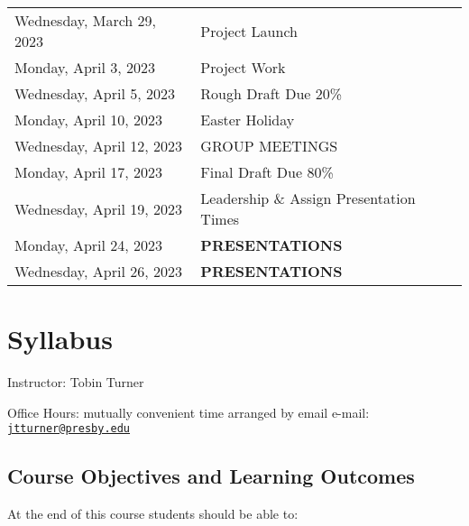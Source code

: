 \documentclass[
]{book}
\begin{document}
\begin{longtable}[]{@{}
  >{\raggedright\arraybackslash}p{}
  >{\raggedright\arraybackslash}p{}@{}}
Wednesday, March 29, 2023 & Project Launch \\
Monday, April 3, 2023 & Project Work \\
Wednesday, April 5, 2023 & Rough Draft Due 20\% \\
Monday, April 10, 2023 & Easter Holiday \\
Wednesday, April 12, 2023 & GROUP MEETINGS \\
Monday, April 17, 2023 & Final Draft Due 80\% \\
Wednesday, April 19, 2023 & Leadership \& Assign Presentation Times \\
Monday, April 24, 2023 & \textbf{PRESENTATIONS} \\
Wednesday, April 26, 2023 & \textbf{PRESENTATIONS} \\
\bottomrule()
\end{longtable}

\hypertarget{syllabus}{%
\chapter*{Syllabus}\label{syllabus}}

Instructor: Tobin Turner

Office Hours: mutually convenient time arranged by email e-mail: \href{mailto:jtturner@presby.edu}{\nolinkurl{jtturner@presby.edu}}

\hypertarget{course-objectives-and-learning-outcomes}{%
\section*{Course Objectives and Learning Outcomes}\label{course-objectives-and-learning-outcomes}}

At the end of this course students should be able to:
\end{document}
